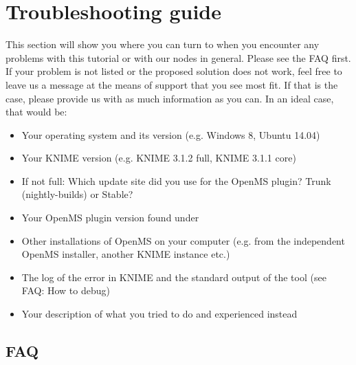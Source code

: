 \section{Troubleshooting guide}
This section will show you where you can turn to when you encounter any problems with this tutorial or with our
nodes in general. Please see the FAQ first. If your problem is not listed or the proposed solution does not work,
feel free to leave us a message at the means of support that you see most fit. If that is the case, please provide us 
with as much information as you can. In an ideal case, that would be:
\begin{itemize}
\item Your operating system and its version (e.g. Windows 8, Ubuntu 14.04)
\item Your KNIME version (e.g. KNIME 3.1.2 full, KNIME 3.1.1 core)
\item If not full: Which update site did you use for the OpenMS plugin? Trunk (nightly-builds) or Stable?
\item Your OpenMS plugin version found under\\
\item Other installations of OpenMS on your computer (e.g. from the independent OpenMS installer, another KNIME instance etc.)
\item The log of the error in KNIME and the standard output of the tool (see FAQ: How to debug)
\item Your description of what you tried to do and experienced instead
\end{itemize}

\subsection{FAQ}

